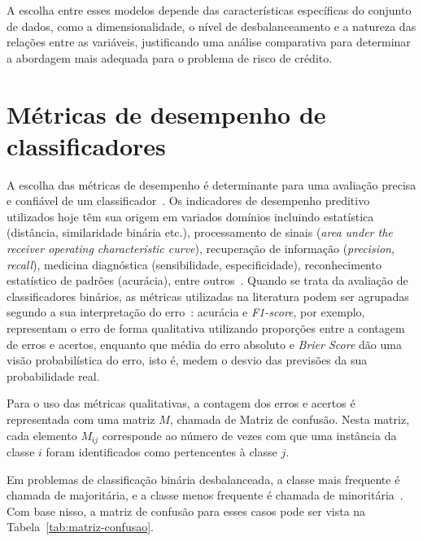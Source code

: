 A escolha entre esses modelos depende das características específicas do conjunto de dados, como a dimensionalidade, o nível de desbalanceamento e a natureza das relações entre as variáveis, justificando uma análise comparativa para determinar a abordagem mais adequada para o problema de risco de crédito.

\section{Métricas de desempenho de classificadores}

A escolha das métricas de desempenho é determinante para uma avaliação precisa e confiável de um classificador~\cite{Gaudreault2021}. Os indicadores de desempenho preditivo utilizados hoje têm sua origem em variados domínios incluindo estatística (distância, similaridade binária etc.), processamento de sinais (\textit{area under the receiver operating characteristic curve}), recuperação de informação (\textit{precision}, \textit{recall}), medicina diagnóstica (sensibilidade, especificidade), reconhecimento estatístico de padrões (acurácia), entre outros~\cite{Canbek2023}. Quando se trata da avaliação de classificadores binários, as métricas utilizadas na literatura podem ser agrupadas segundo a sua interpretação do erro~\cite{Ferri2009}:  acurácia e \textit{F1-score}, por exemplo, representam o erro de forma qualitativa utilizando proporções entre a contagem de erros e acertos, enquanto que média do erro absoluto e \textit{Brier Score} dão uma visão probabilística do erro, isto é, medem o desvio das previsões da sua probabilidade real.

Para o uso das métricas qualitativas, a contagem dos erros e acertos é representada com uma matriz \(M\), chamada de Matriz de confusão. Nesta matriz, cada elemento \(M_{ij}\) corresponde ao número de vezes com que uma instância da classe \(i\) foram identificados como pertencentes à classe \(j\).

Em problemas de classificação binária desbalanceada, a classe mais frequente é chamada de majoritária, e a classe menos frequente é chamada de minoritária~\cite{Seiffert2008,Batuwita2010}. Com base nisso, a matriz de confusão para esses casos pode ser vista na Tabela~\ref{tab:matriz-confusao}.

